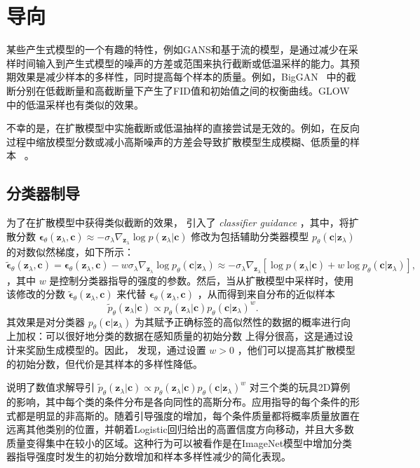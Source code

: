 \documentclass{article}
\newcommand{\bc}{\mathbf{c}}
\newcommand{\bz}{\mathbf{z}}
\newcommand{\bepsilon}{{\boldsymbol{\epsilon}}}
\begin{document}
 \section{
导向} 
 \label{sec:guidance} 


某些产生式模型的一个有趣的特性，例如GANS和基于流的模型，是通过减少在采样时间输入到产生式模型的噪声的方差或范围来执行截断或低温采样的能力。其预期效果是减少样本的多样性，同时提高每个样本的质量。例如，BigGAN~ \citep{brock2018large} 中的截断分别在低截断量和高截断量下产生了FID值和初始值之间的权衡曲线。GLOW~ \citep{kingma2018glow} 中的低温采样也有类似的效果。


不幸的是，在扩散模型中实施截断或低温抽样的直接尝试是无效的。例如，在反向过程中缩放模型分数或减小高斯噪声的方差会导致扩散模型生成模糊、低质量的样本~ \citep{dhariwal2021diffusion} 。


 \subsection{
分类器制导} 


为了在扩散模型中获得类似截断的效果， \citet{dhariwal2021diffusion} 引入了 \emph{classifier guidance} ，其中，将扩散分数 $\bepsilon_\theta(\bz_\lambda, \bc) \approx -\sigma_\lambda \nabla_{\bz_\lambda}\log p(\bz_\lambda |  \bc)$ 修改为包括辅助分类器模型 $p_{\theta}(\bc | \bz_\lambda)$ 的对数似然梯度，如下所示：
 \[
\tilde{\bepsilon}_\theta(\bz_\lambda, \bc) = \bepsilon_\theta(\bz_\lambda, \bc) - w\sigma_{\lambda}\nabla_{\bz_\lambda}\log p_{\theta}(\bc | \bz_\lambda) \approx -\sigma_{\lambda}\nabla_{\bz_\lambda}[\log p(\bz_\lambda |  \bc) + w \log p_{\theta}(\bc | \bz_\lambda) ],
\] ，其中 $w$ 是控制分类器指导的强度的参数。然后，当从扩散模型中采样时，使用该修改的分数 $\tilde{\bepsilon}_\theta(\bz_\lambda, \bc)$ 来代替 $\bepsilon_\theta(\bz_\lambda, \bc)$ ，从而得到来自分布的近似样本
 \[\tilde{p}_{\theta}(\bz_\lambda | \bc) \propto p_{\theta}(\bz_\lambda | \bc)p_{\theta}(\bc | \bz_\lambda)^{w}.\] 其效果是对分类器 $p_{\theta}(\bc | \bz_\lambda)$ 为其赋予正确标签的高似然性的数据的概率进行向上加权：可以很好地分类的数据在感知质量的初始分数 \citep{salimans2016improved} 上得分很高，这是通过设计来奖励生成模型的。因此， \citeauthor{dhariwal2021diffusion} 发现，通过设置 $w > 0$ ，他们可以提高其扩散模型的初始分数，但代价是其样本的多样性降低。


  说明了数值求解导引 $\tilde{p}_{\theta}(\bz_\lambda | \bc) \propto p_{\theta}(\bz_\lambda | \bc)p_{\theta}(\bc | \bz_\lambda)^{w}$ 对三个类的玩具2D算例的影响，其中每个类的条件分布是各向同性的高斯分布。应用指导的每个条件的形式都是明显的非高斯的。随着引导强度的增加，每个条件质量都将概率质量放置在远离其他类别的位置，并朝着Logistic回归给出的高置信度方向移动，并且大多数质量变得集中在较小的区域。这种行为可以被看作是在ImageNet模型中增加分类器指导强度时发生的初始分数增加和样本多样性减少的简化表现。
\end{document}

